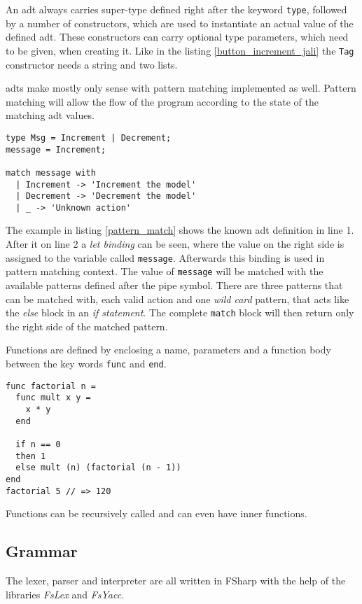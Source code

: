 An \gls{adt} always carries super-type defined right after the keyword \texttt{type}, followed by a number of constructors, which are used to instantiate an actual value of the defined \gls{adt}. These constructors can carry optional type parameters, which need to be given, when creating it. Like in the listing \ref{button_increment_jali} the \texttt{Tag} constructor needs a string and two lists.

\glspl{adt} make mostly only sense with pattern matching implemented as well. Pattern matching will allow the flow of the program according to the state of the matching \gls{adt} values.

\begin{lstlisting}[columns=fullflexible, label={pattern_match}, language=JaLi, caption=Pattern matching on Msg]
type Msg = Increment | Decrement;
message = Increment;

match message with
  | Increment -> 'Increment the model'
  | Decrement -> 'Decrement the model'
  | _ -> 'Unknown action'
\end{lstlisting}

The example in listing \ref{pattern_match} shows the known \gls{adt} definition in line 1. After it on line 2 a \textit{let binding} can be seen, where the value on the right side is assigned to the variable called \texttt{message}. Afterwards this binding is used in pattern matching context. The value of \texttt{message} will be matched with the available patterns defined after the pipe symbol. There are three patterns that can be matched with, each valid action and one \textit{wild card} pattern, that acts like the \textit{else} block in an \textit{if statement}. The complete \texttt{match} block will then return only the right side of the matched pattern.

Functions are defined by enclosing a name, parameters and a function body between the key words \texttt{func} and \texttt{end}.

\begin{lstlisting}[columns=fullflexible, label={pattern_match}, language=JaLi, caption=Pattern matching on Msg]
func factorial n =
  func mult x y =
    x * y
  end
  
  if n == 0
  then 1
  else mult (n) (factorial (n - 1))
end
factorial 5 // => 120
\end{lstlisting}

Functions can be recursively called and can even have inner functions.

\subsection{Grammar}\label{Grammar}
The lexer, parser and interpreter are all written in FSharp with the help of the libraries \textit{FsLex} and \textit{FsYacc}.

